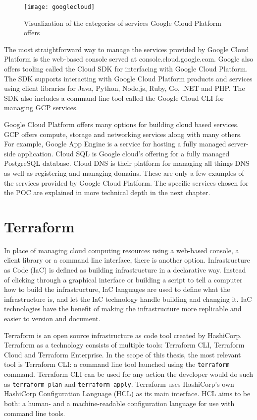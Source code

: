 \begin{figure}[!htb]
\centering
\texttt{[image: googlecloud]}
\caption{Visualization of the categories of services Google Cloud Platform offers}
\label{fig:google-cloud}
\end{figure}

The most straightforward way to manage the services provided by Google Cloud Platform is the web-based console served at console.cloud.google.com.
Google also offers tooling called the Cloud SDK for interfacing with Google Cloud Platform.
The SDK supports interacting with Google Cloud Platform products and services using client libraries for Java, Python, Node.js, Ruby, Go, .NET and PHP.
The SDK also includes a command line tool called the Google Cloud CLI for managing GCP services.
\cite{googlecloud}

Google Cloud Platform offers many options for building cloud based services.
GCP offers compute, storage and networking services along with many others.
For example, Google App Engine is a service for hosting a fully managed server-side application.
Cloud SQL is Google cloud's offering for a fully managed PostgreSQL database.
Cloud DNS is their platform for managing all things DNS as well as registering and managing domains.
These are only a few examples of the services provided by Google Cloud Platform.
The specific services chosen for the POC are explained in more technical depth in the next chapter.
\cite{googlecloud}

\section{Terraform}

In place of managing cloud computing resources using a web-based console, a client library or a command line interface, there is another option.
Infrastructure as Code (IaC) is defined as building infrastructure in a declarative way.
Instead of clicking through a graphical interface or building a script to tell a computer how to build the infrastructure, IaC languages are used to define what the infrastructure is, and let the IaC technology handle building and changing it.
IaC technologies have the benefit of making the infrastructure more replicable and easier to version and document.
\cite{terraform}

Terraform is an open source infrastructure as code tool created by Hashi\-Corp.
Terraform as a technology consists of multiple tools: Terraform CLI, Terraform Cloud and Terraform Enterprise.
In the scope of this thesis, the most relevant tool is Terraform CLI: a command line tool launched using the \verb|terraform| command.
Terraform CLI can be used for any action the developer would do such as \verb|terraform plan| and \verb|terraform apply|.
Terraform uses HashiCorp's own Hashi\-Corp Configuration Language (HCL) as its main interface.
HCL aims to be both: a human- and a machine-readable configuration language for use with command line tools.
\cite{terraform}

